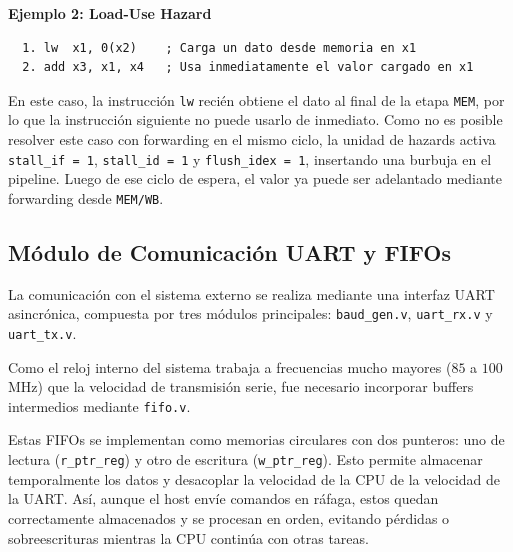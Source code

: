 \textbf{Ejemplo 2: Load-Use Hazard}
\begin{verbatim}
  1. lw  x1, 0(x2)    ; Carga un dato desde memoria en x1
  2. add x3, x1, x4   ; Usa inmediatamente el valor cargado en x1
\end{verbatim}

En este caso, la instrucción \texttt{lw} recién obtiene el dato al final de la etapa \texttt{MEM}, por lo que la instrucción siguiente no puede usarlo de inmediato. Como no es posible resolver este caso con forwarding en el mismo ciclo, la unidad de hazards activa \texttt{stall\_if = 1}, \texttt{stall\_id = 1} y \texttt{flush\_idex = 1}, insertando una burbuja en el pipeline. Luego de ese ciclo de espera, el valor ya puede ser adelantado mediante forwarding desde \texttt{MEM/WB}.

\subsection{Módulo de Comunicación UART y FIFOs}
La comunicación con el sistema externo se realiza mediante una interfaz UART asincrónica, compuesta por tres módulos principales: \texttt{baud\_gen.v}, \texttt{uart\_rx.v} y \texttt{uart\_tx.v}.

Como el reloj interno del sistema trabaja a frecuencias mucho mayores ($85$ a $100$ MHz) que la velocidad de transmisión serie, fue necesario incorporar buffers intermedios mediante \texttt{fifo.v}.

Estas FIFOs se implementan como memorias circulares con dos punteros: uno de lectura (\texttt{r\_ptr\_reg}) y otro de escritura (\texttt{w\_ptr\_reg}). Esto permite almacenar temporalmente los datos y desacoplar la velocidad de la CPU de la velocidad de la UART. Así, aunque el host envíe comandos en ráfaga, estos quedan correctamente almacenados y se procesan en orden, evitando pérdidas o sobreescrituras mientras la CPU continúa con otras tareas.